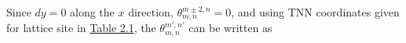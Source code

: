 \documentclass{report}
\begin{document}
\noindent Since $dy = 0$ along the $x$ direction, $\theta_{m,n}^{m \pm 2, n} = 0$, and using \ac{TNN} coordinates given for lattice site in \hyperref[Table 2.1]{Table 2.1}, the $\theta_{m,n}^{m',n'}$ can be written as
\end{document}
